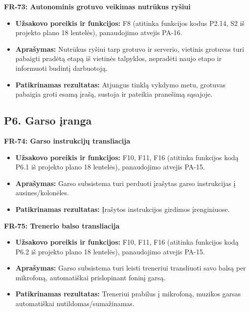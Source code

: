 \vspace{0.3cm}
\noindent\textbf{FR-73: Autonominis grotuvo veikimas nutrūkus ryšiui}
\begin{itemize}
    \item \textbf{Užsakovo poreikis ir funkcijos:} F8 (atitinka funkcijos kodus P2.14, S2 iš projekto plano 18 lentelės), panaudojimo atvejis PA-16.
    \item \textbf{Aprašymas:} Nutrūkus ryšiui tarp grotuvo ir serverio, vietinis grotuvas turi pabaigti pradėtą etapą iš vietinės talpyklos, nepradėti naujo etapo ir informuoti budintį darbuotoją.
    \item \textbf{Patikrinamas rezultatas:} Atjungus tinklą vykdymo metu, grotuvas pabaigia groti esamą įrašą, sustoja ir pateikia pranešimą sąsajoje.
\end{itemize}

\subsection{P6. Garso įranga}

\vspace{0.3cm}
\noindent\textbf{FR-74: Garso instrukcijų transliacija}
\begin{itemize}
    \item \textbf{Užsakovo poreikis ir funkcijos:} F10, F11, F16 (atitinka funkcijos kodą P6.1 iš projekto plano 18 lentelės), panaudojimo atvejis PA-15.
    \item \textbf{Aprašymas:} Garso subsistema turi perduoti įrašytas garso instrukcijas į ausines/kolonėles.
    \item \textbf{Patikrinamas rezultatas:} Įrašytos instrukcijos girdimos įrenginiuose.
\end{itemize}

\vspace{0.3cm}
\noindent\textbf{FR-75: Trenerio balso transliacija}
\begin{itemize}
    \item \textbf{Užsakovo poreikis ir funkcijos:} F10, F11, F16 (atitinka funkcijos kodą P6.2 iš projekto plano 18 lentelės), panaudojimo atvejis PA-15.
    \item \textbf{Aprašymas:} Garso subsistema turi leisti treneriui transliuoti savo balsą per mikrofoną, automatiškai prislopinant foninį garsą.
    \item \textbf{Patikrinamas rezultatas:} Treneriui prabilus į mikrofoną, muzikos garsas automatiškai nutildomas/sumažinamas.
\end{itemize}

